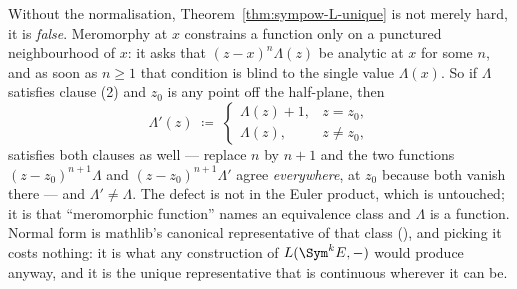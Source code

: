 \begin{remark}
  \label{rem:L-normal-form}
  Without the normalisation, Theorem~\ref{thm:sympow-L-unique} is not merely hard, it is
  \emph{false}. Meromorphy at $x$ constrains a function only on a punctured neighbourhood of
  $x$: it asks that $(z-x)^{n}\Lambda(z)$ be analytic at $x$ for some $n$, and as soon as
  $n \geq 1$ that condition is blind to the single value $\Lambda(x)$. So if $\Lambda$
  satisfies clause (2) and $z_{0}$ is any point off the half-plane, then
  \[
    \Lambda'(z) \;\coloneqq\; \begin{cases}\Lambda(z)+1, & z = z_{0},\\ \Lambda(z), &
      z \neq z_{0},\end{cases}
  \]
  satisfies both clauses as well --- replace $n$ by $n+1$ and the two functions
  $(z-z_{0})^{n+1}\Lambda$ and $(z-z_{0})^{n+1}\Lambda'$ agree \emph{everywhere}, at $z_{0}$
  because both vanish there --- and $\Lambda' \neq \Lambda$. The defect is not in the Euler
  product, which is untouched; it is that ``meromorphic function'' names an equivalence class
  and $\Lambda$ is a function. Normal form is mathlib's canonical representative of that class
  (), and picking it costs nothing: it is what any construction of
  $L(\Sym^{k}E,-)$ would produce anyway, and it is the unique representative that is
  continuous wherever it can be.
\end{remark}

